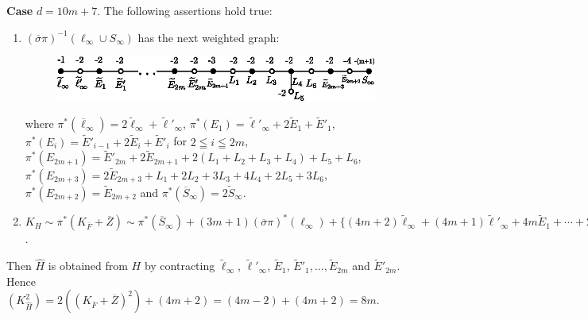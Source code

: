 \subsubsection{}\label{chap3:3.6.6}
{\bf Case} $d=10m+7$. The following assertions hold true:
\begin{enumerate}
\renewcommand{\labelenumi}{(\theenumi)}
\item $(\overline{\sigma}\pi)^{-1}(\ell_{\infty}\cup S_{\infty})$ has
  the next weighted graph:
\begin{figure}[H]
\centering
\includegraphics{figures/miyansi_fig49.eps}
\end{figure}
\noindent
where
$\pi^{\ast}(\overline{\ell}_{\infty})=2\widetilde{\ell}_{\infty}+\widetilde{\ell}'_{\infty}$,
$\pi^{\ast}(E_{1})=\widetilde{\ell}'_{\infty}+2\widetilde{E}_{1}+\widetilde{E}'_{1}$,
$\pi^{\ast}(E_{i})=\widetilde{E}'_{i-1}+2\widetilde{E}_{i}+\widetilde{E}'_{i}$
for $2\leqq i\leqq 2m$,
$\pi^{\ast}(E_{2m+1})=\widetilde{E}'_{2m}+2\widetilde{E}_{2m+1}+2(L_{1}+L_{2}+L_{3}+L_{4})+L_{5}+L_{6}$,
$\pi^{\ast}(E_{2m+3})=2\widetilde{E}_{2m+3}+L_{1}+2L_{2}+3L_{3}+4L_{4}+2L_{5}+3L_{6}$,\pageoriginale\
$\pi^{\ast}(E_{2m+2})=\widetilde{E}_{2m+2}$ and
$\pi^{\ast}(\overline{S}_{\infty})=2\widetilde{S}_{\infty}$.

\item $K_{H}\sim
  \pi^{\ast}(K_{\overline{F}}+\overline{Z})\sim\pi^{\ast}(\overline{S}_{\infty})+(3m+1)(\overline{\sigma}\pi)^{\ast}(\ell_{\infty})+\{(4m+2)\widetilde{\ell}_{\infty}+(4m+1)\widetilde{\ell}'_{\infty}+4m\widetilde{E}_{1}+\cdots+2\widetilde{E}_{2m}+\widetilde{E}'_{2m}\}$.
\end{enumerate}

Then $\widehat{H}$ is obtained from $H$ by contracting
$\widetilde{\ell}_{\infty}$, $\widetilde{\ell}'_{\infty}$,
$\widetilde{E}_{1}$, $\widetilde{E}'_{1},\ldots,\widetilde{E}_{2m}$
and $\widetilde{E}'_{2m}$. Hence
$(K^{2}_{\hat{H}})=2((K_{\overline{F}}+\overline{Z})^{2})+(4m+2)=(4m-2)+(4m+2)=8m$. 

